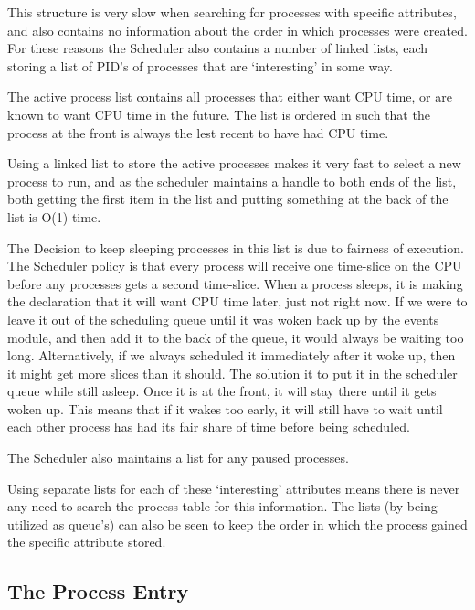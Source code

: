 \documentclass[a4paper]{report}
\begin{document}
This structure is very slow when searching for processes with specific attributes, and also contains no information about the order in which processes were created. For these reasons the Scheduler also contains a number of linked lists, each storing a list of PID's of processes that are `interesting' in some way.

The active process list contains all processes that either want CPU time, or are known to want CPU time in the future. The list is ordered in such that the process at the front is always the lest recent to have had CPU time.

Using a linked list to store the active processes makes it very fast to select a new process to run, and as the scheduler maintains a handle to both ends of the list, both getting the first item in the list and putting something at the back of the list is O(1) time.

The Decision to keep sleeping processes in this list is due to fairness of execution. The Scheduler policy is that every process will receive one time-slice on the CPU before any processes gets a second time-slice. When a process sleeps, it is making the declaration that it will want CPU time later, just not right now. If we were to leave it out of the scheduling queue until it was woken back up by the events module, and then add it to the back of the queue, it would always be waiting too long. Alternatively, if we always scheduled it immediately after it woke up, then it might get more slices than it should. The solution it to put it in the scheduler queue while still asleep. Once it is at the front, it will stay there until it gets woken up. This means that if it wakes too early, it will still have to wait until each other process has had its fair share of time before being scheduled.

The Scheduler also maintains a list for any paused processes.

Using separate lists for each of these `interesting' attributes means there is never any need to search the process table for this information. The lists (by being utilized as queue's) can also be seen to keep the order in which the process gained the specific attribute stored.

\clearpage
\subsection{The Process Entry}
\end{document}
